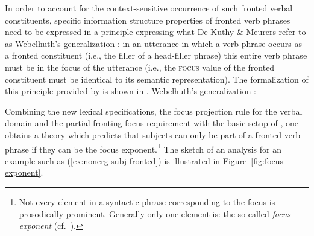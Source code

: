 \documentclass[output=paper,biblatex,babelshorthands,newtxmath,draftmode,colorlinks,citecolor=brown]{langscibook}
\begin{document}
\noindent
In order to account for the context-sensitive occurrence of such
fronted verbal constituents, specific information structure properties
of fronted verb phrases need to be expressed in a principle expressing
what De Kuthy \& Meurers refer to as Webelhuth's generalization \citep[53]{Webelhuth90}: in
an utterance in which a verb phrase occurs as a fronted constituent
(i.e., the filler of a head-filler phrase) this entire verb phrase
must be in the focus of the utterance (i.e., the \textsc{focus} value
of the fronted constituent must be identical to its semantic
representation).  The formalization of this principle provided by \citep{dKM2003a} is shown in .
\ea
Webelhuth's generalization \citep[]{dKM2003a}:\\
\begin{flushleft}
\impl
\end{flushleft}
\begin{flushright}
\medskip
\label{fig:webelhuths-generalization}
\end{flushright}\unskip
\z
Combining the new lexical specifications, the focus projection rule
for the verbal domain and the partial fronting focus requirement with
the basic setup of \citet{deKuthy2002a}, one obtains a theory which
predicts that subjects can only be part of a fronted verb phrase
if they can be the focus exponent.\footnote{Not every element in a syntactic phrase corresponding to the focus is prosodically prominent. Generally only one element is: the so-called \textit{focus exponent} (cf.\ \citealt[]{Selkirk95a-u}).} The sketch of an analysis for an
example such as (\ref{ex:nonerg-subj-fronted}) is illustrated in
Figure~\ref{fig:focus-exponent}.
\end{document}
